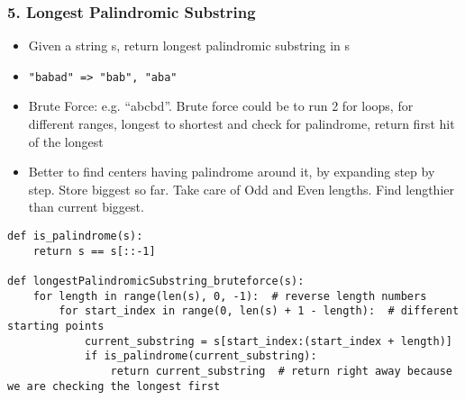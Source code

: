 \begin{frame}[fragile]\frametitle{5. Longest Palindromic Substring}


	\begin{itemize}
	\item Given a string s, return longest palindromic substring in s
	\item \lstinline|"babad" => "bab", "aba"|
	\item Brute Force: e.g. ``abcbd''. Brute force could be to run 2 for loops, for different ranges, longest to shortest and check for palindrome, return first hit of the longest
	\item Better to find centers having palindrome around it, by expanding step by step. Store biggest so far. Take care of Odd and Even lengths. Find lengthier than current biggest.
	\end{itemize}
	


		\begin{lstlisting}[basicstyle=\scriptsize]
def is_palindrome(s):
    return s == s[::-1]
		
def longestPalindromicSubstring_bruteforce(s):
    for length in range(len(s), 0, -1):  # reverse length numbers
        for start_index in range(0, len(s) + 1 - length):  # different starting points
            current_substring = s[start_index:(start_index + length)]
            if is_palindrome(current_substring):
                return current_substring  # return right away because we are checking the longest first
		\end{lstlisting}		


\end{frame}

